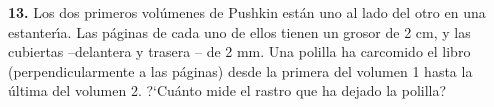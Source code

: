 \documentclass[12pt]{article}  %
\begin{document}
{\bf 13.} Los dos primeros vol\'umenes de Pushkin est\'an uno al lado del otro en una estanter\'{\i}a. 
Las p\'aginas de cada uno de ellos tienen un grosor de 2 cm, y las cubiertas --delantera y trasera 
-- de 2 mm. Una polilla ha carcomido el libro (perpendicularmente a las p\'aginas) desde la primera del volumen 1 hasta
 la \'ultima del volumen 2.
?`Cu\'anto mide el rastro que ha dejado la polilla?
\end{document}
